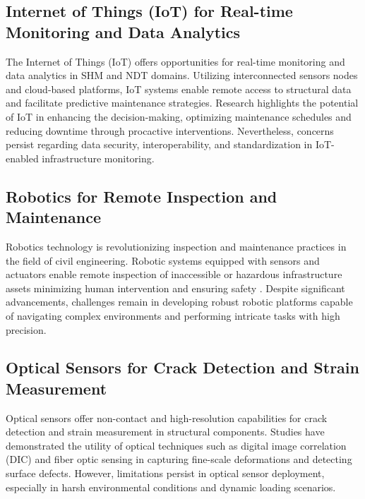 \documentclass[journal, a4paper]{IEEEtran}
\begin{document}
\subsection{Internet of Things (IoT) for Real-time Monitoring and Data Analytics}
The Internet of Things (IoT) offers opportunities for real-time monitoring and data analytics in SHM and NDT domains.
Utilizing interconnected sensors nodes and cloud-based platforms, IoT systems enable remote access to structural data
and facilitate predictive maintenance strategies.
Research \cite{prasad_real-time_2024} \cite{willmann_health_2023} \cite{fang_structural_2024} highlights the potential of IoT in enhancing
the decision-making, optimizing maintenance schedules and reducing downtime through procactive interventions.
Nevertheless, concerns persist regarding data security, interoperability, and standardization in IoT-enabled
infrastructure monitoring.


\subsection{Robotics for Remote Inspection and Maintenance}
Robotics technology is revolutionizing inspection and maintenance practices in the field of civil engineering.
Robotic systems equipped with sensors and actuators enable remote inspection of inaccessible or hazardous infrastructure assets
 minimizing human intervention and ensuring safety 
 \cite{moradi_intelligent_2023} \cite{zhang_structural_2021} \cite{yifei_structure_2023}. Despite significant advancements,
 challenges remain in developing robust robotic platforms capable of navigating complex environments
 and performing intricate tasks with high precision.

\subsection{Optical Sensors for Crack Detection and Strain Measurement}
Optical sensors offer non-contact and high-resolution capabilities for crack detection and strain measurement
in structural components.
Studies \cite{ziaja_shm_2021} \cite{sanchez-romate_structural_2021} \cite{tang_explainable_2023} have demonstrated the utility of optical techniques such as
digital image correlation (DIC) and fiber optic sensing in capturing fine-scale deformations and detecting surface defects.
However, limitations persist in optical sensor deployment, especially in harsh environmental conditions and dynamic loading
scenarios. 
\end{document}

